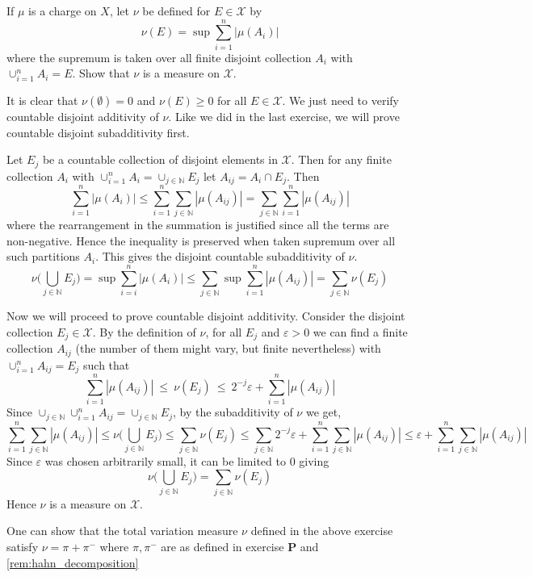 \begin{exercise}
	If $\mu$ is a charge on $X$, let $\nu$ be defined for $E \in \mathcal{X}$ by $$\nu(E) = \sup \sum_{i=1}^{n} |\mu(A_i)|$$
	where the supremum is taken over all finite disjoint collection $ A_i$ with $\cup_{i = 1}^{n}A_i = E$. Show that $\nu$ is a measure on $\mathcal{X}$.
\end{exercise}
\begin{solution}
	It is clear that $\nu(\emptyset) = 0$ and $\nu(E) \ge 0$ for all $E \in \mathcal{X}$. We just need to verify countable disjoint additivity of $\nu$. Like we did in the last exercise, we will prove countable disjoint subadditivity first.

	Let $E_j$ be a countable collection of disjoint elements in $\mathcal{X}$. Then for any finite collection $A_i$ with $ \cup_{i = 1}^{n}A_i = \cup_{j \in \mathbb{N}}E_j$ let $A_{ij} = A_i \cap E_j$. Then $$\sum_{i = 1}^{n} |\mu(A_i)| \le \sum_{i = 1}^{n} \sum_{j \in \mathbb{N}} |\mu(A_{ij})| = \sum_{j \in \mathbb{N}} \sum_{i = 1}^{n} |\mu(A_{ij})|$$
	where the rearrangement in the summation is justified since all the terms are non-negative. Hence the inequality is preserved when taken supremum over all such partitions $A_i$. This gives the disjoint countable subadditivity of $\nu$. $$\nu \Big(\bigcup_{j \in \mathbb{N}} E_j \Big) = \sup \sum_{i = i}^{n} |\mu(A_i)| \le \sum_{j \in \mathbb{N}} \sup \sum_{i = 1}^{n} |\mu(A_{ij})| = \sum_{j \in \mathbb{N}} \nu(E_j)$$

	Now we will proceed to prove countable disjoint additivity. Consider the disjoint collection $E_j \in \mathcal{X}$. By the definition of $\nu$, for all $E_{j}$ and $ \varepsilon > 0$ we can find a finite collection $A_{ij}$ (the number of them might vary, but finite nevertheless) with $\cup_{i = 1}^{n}A_{ij} = E_j$ such that $$\sum_{i = 1}^{n} |\mu(A_{ij})| \ \le \ \nu(E_{j}) \ \le \ 2^{-j}\varepsilon + \sum_{i = 1}^{n} |\mu(A_{ij})|$$
	Since $\cup_{j \in \mathbb{N}}\cup_{i = 1}^{n} A_{ij} = \cup_{j \in \mathbb{N}} E_{j}$, by the subadditivity of $\nu$ we get, $$\sum_{i = 1}^{n} \sum_{j \in \mathbb{N}} |\mu(A_{ij})| \le \nu \Big(\bigcup_{j \in \mathbb{N}}E_j\Big) \le \sum_{ j \in \mathbb{N}} \nu(E_{j}) \le \sum_{j \in \mathbb{N}} 2^{-j}\varepsilon + \sum_{i = 1}^{n}\sum_{j \in \mathbb{N}} |\mu(A_{ij})| \le \varepsilon + \sum_{i = 1}^{n}\sum_{j \in \mathbb{N}} |\mu(A_{ij})|$$
	Since $\varepsilon$ was chosen arbitrarily small, it can be limited to $0$ giving $$\nu \Big(\bigcup_{j \in \mathbb{N}}E_j\Big) = \sum_{ j \in \mathbb{N}} \nu(E_{j})$$
	Hence $\nu$ is a measure on $\mathcal{X}$.
\end{solution}
\begin{remark}
	One can show that the total variation measure $\nu$ defined in the above exercise satisfy $\nu = \pi + \pi^{-}$ where $\pi, \pi^{-}$ are as defined in exercise \textbf{P} and \autoref{rem:hahn_decomposition}
\end{remark}

